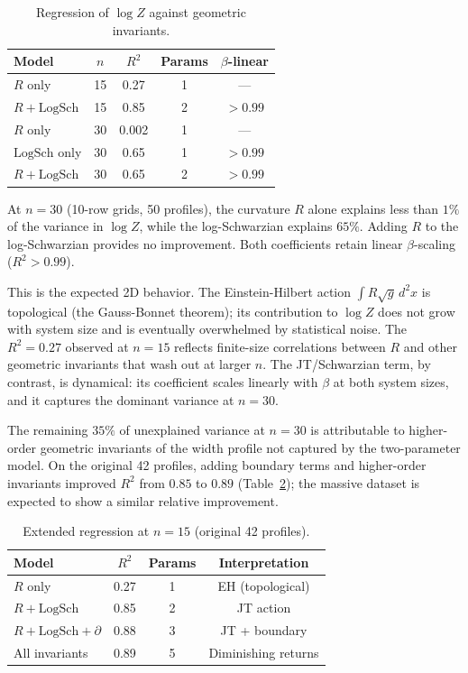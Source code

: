 \documentclass[aps,prd,twocolumn,superscriptaddress]{revtex4-2}
\begin{document}
\begin{table}[h]
\caption{Regression of $\log Z$ against geometric invariants.}
\label{tab:regression}
\begin{ruledtabular}
\begin{tabular}{lcccc}
Model & $n$ & $R^2$ & Params & $\beta$-linear \\
\midrule
$R$ only & 15 & 0.27 & 1 & --- \\
$R + \mathrm{LogSch}$ & 15 & 0.85 & 2 & $>0.99$ \\
\midrule
$R$ only & 30 & 0.002 & 1 & --- \\
$\mathrm{LogSch}$ only & 30 & 0.65 & 1 & $>0.99$ \\
$R + \mathrm{LogSch}$ & 30 & 0.65 & 2 & $>0.99$ \\
\end{tabular}
\end{ruledtabular}
\end{table}

At $n = 30$ (10-row grids, 50 profiles), the curvature $R$ alone
explains less than $1\%$ of the variance in $\log Z$, while the
log-Schwarzian explains $65\%$. Adding $R$ to the log-Schwarzian
provides no improvement. Both coefficients retain linear
$\beta$-scaling ($R^2 > 0.99$).

This is the expected 2D behavior. The Einstein-Hilbert action
$\int R \sqrt{g}\, d^2x$ is topological (the Gauss-Bonnet theorem);
its contribution to $\log Z$ does not grow with system size and is
eventually overwhelmed by statistical noise. The $R^2 = 0.27$
observed at $n = 15$ reflects finite-size correlations between $R$
and other geometric invariants that wash out at larger $n$. The
JT/Schwarzian term, by contrast, is dynamical: its coefficient
scales linearly with $\beta$ at both system sizes, and it captures
the dominant variance at $n = 30$.

The remaining $35\%$ of unexplained variance at $n = 30$ is
attributable to higher-order geometric invariants of the width
profile not captured by the two-parameter model. On the original
42 profiles, adding boundary
terms and higher-order invariants improved $R^2$ from
$0.85$ to $0.89$ (Table~\ref{tab:regression15}); the massive
dataset is expected to show a similar relative improvement.

\begin{table}[h]
\caption{Extended regression at $n = 15$ (original 42 profiles).}
\label{tab:regression15}
\begin{ruledtabular}
\begin{tabular}{lccc}
Model & $R^2$ & Params & Interpretation \\
\midrule
$R$ only & 0.27 & 1 & EH (topological) \\
$R + \mathrm{LogSch}$ & 0.85 & 2 & JT action \\
$R + \mathrm{LogSch} + \partial$ & 0.88 & 3 & JT + boundary \\
All invariants & 0.89 & 5 & Diminishing returns \\
\end{tabular}
\end{ruledtabular}
\end{table}
\end{document}
